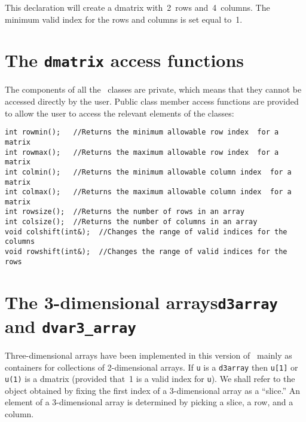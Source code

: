 \documentclass{admbmanual}
\begin{document}
This declaration will create a dmatrix with~2~rows and~4~columns. The minimum
valid index for the rows and columns is set equal to~1.

\section{The \texttt{dmatrix} access functions}

The components of all the \scAD\ classes are private, which means that they
cannot be accessed directly by the user. Public class member access functions
are provided to allow the user to access the relevant elements of the classes:
\begin{lstlisting}
int rowmin();   //Returns the minimum allowable row index  for a matrix
int rowmax();   //Returns the maximum allowable row index  for a matrix
int colmin();   //Returns the minimum allowable column index  for a matrix
int colmax();   //Returns the maximum allowable column index  for a matrix
int rowsize();  //Returns the number of rows in an array
int colsize();  //Returns the number of columns in an array
void colshift(int&);  //Changes the range of valid indices for the columns
void rowshift(int&);  //Changes the range of valid indices for the rows
\end{lstlisting}

\section{The 3-dimensional arrays\br \texttt{d3array} and \texttt{dvar3\_array}}

Three-dimensional arrays have been implemented in this version of \scAD\ mainly
as containers for collections of 2-dimensional arrays. If \texttt{u} is a
\texttt{d3array} then \texttt{u[1]} or \texttt{u(1)} is a dmatrix (provided
that~1 is a valid index for \texttt{u}). We shall refer to the object obtained
by fixing the first index of a 3-dimensional array as a ``slice.'' An element of
a 3-dimensional array is determined by picking a slice, a row, and a column.
 
\end{document}
